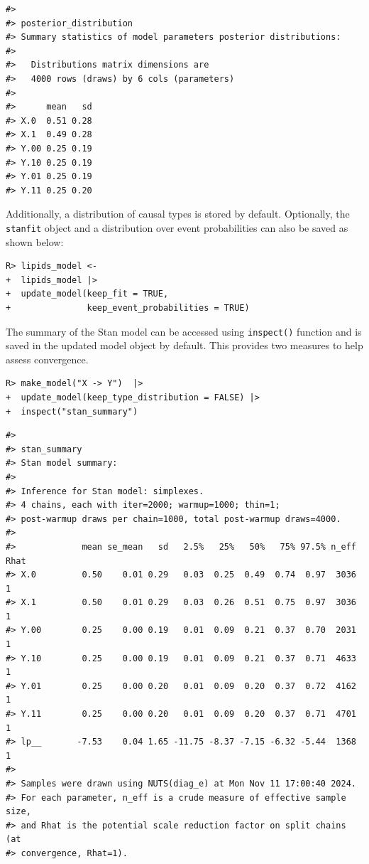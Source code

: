 \documentclass[
  11pt,
  article]{jss}
\begin{document}
\begin{verbatim}
#> 
#> posterior_distribution
#> Summary statistics of model parameters posterior distributions:
#> 
#>   Distributions matrix dimensions are 
#>   4000 rows (draws) by 6 cols (parameters)
#> 
#>      mean   sd
#> X.0  0.51 0.28
#> X.1  0.49 0.28
#> Y.00 0.25 0.19
#> Y.10 0.25 0.19
#> Y.01 0.25 0.19
#> Y.11 0.25 0.20
\end{verbatim}

Additionally, a distribution of causal types is stored by default.
Optionally, the \texttt{stanfit} object and a distribution over event
probabilities can also be saved as shown below:

\begin{verbatim}
R> lipids_model <- 
+  lipids_model |> 
+  update_model(keep_fit = TRUE,
+               keep_event_probabilities = TRUE)
\end{verbatim}

The summary of the Stan model can be accessed using \texttt{inspect()}
function and is saved in the updated model object by default. This
provides two measures to help assess convergence.

\begin{verbatim}
R> make_model("X -> Y")  |> 
+  update_model(keep_type_distribution = FALSE) |>
+  inspect("stan_summary") 
\end{verbatim}

\begin{verbatim}
#> 
#> stan_summary
#> Stan model summary:
#> 
#> Inference for Stan model: simplexes.
#> 4 chains, each with iter=2000; warmup=1000; thin=1; 
#> post-warmup draws per chain=1000, total post-warmup draws=4000.
#> 
#>             mean se_mean   sd   2.5%   25%   50%   75% 97.5% n_eff Rhat
#> X.0         0.50    0.01 0.29   0.03  0.25  0.49  0.74  0.97  3036    1
#> X.1         0.50    0.01 0.29   0.03  0.26  0.51  0.75  0.97  3036    1
#> Y.00        0.25    0.00 0.19   0.01  0.09  0.21  0.37  0.70  2031    1
#> Y.10        0.25    0.00 0.19   0.01  0.09  0.21  0.37  0.71  4633    1
#> Y.01        0.25    0.00 0.20   0.01  0.09  0.20  0.37  0.72  4162    1
#> Y.11        0.25    0.00 0.20   0.01  0.09  0.20  0.37  0.71  4701    1
#> lp__       -7.53    0.04 1.65 -11.75 -8.37 -7.15 -6.32 -5.44  1368    1
#> 
#> Samples were drawn using NUTS(diag_e) at Mon Nov 11 17:00:40 2024.
#> For each parameter, n_eff is a crude measure of effective sample size,
#> and Rhat is the potential scale reduction factor on split chains (at 
#> convergence, Rhat=1).
\end{verbatim}
\end{document}

